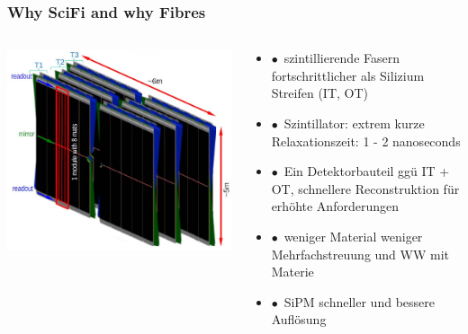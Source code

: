 \documentclass[aspectratio=1610, 12pt, xcolor=dvipsnames]{beamer}
\begin{document}
\begin{frame}\frametitle{Why SciFi and why Fibres}
  \begin{columns}
    \begin{column}[c]{0.48\textwidth}
      \includegraphics[width=\textwidth]{plots/scifi.png}
    \end{column}
    \begin{column}[c]{0.48\textwidth}
      \begin{itemize}
        \item $\bullet$\, szintillierende Fasern fortschrittlicher als Silizium Streifen (IT, OT)
        \item $\bullet$\, Szintillator: extrem kurze Relaxationszeit: 1 - 2 nanoseconds
        \item $\bullet$\, Ein Detektorbauteil ggü IT + OT, schnellere Reconstruktion für erhöhte Anforderungen
        \item $\bullet$\, weniger Material \to weniger Mehrfachstreuung und WW mit Materie
        \item $\bullet$\, SiPM schneller und bessere Auflösung
      \end{itemize}
    \end{column}
  \end{columns}
\end{frame}
\end{document}
